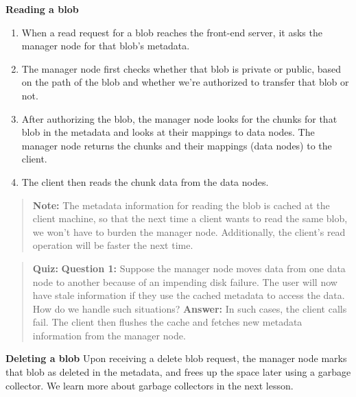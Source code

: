 \textbf{Reading a blob}

\begin{enumerate}
\item
\protect{}\label{Gf-6ti_XA_hLb9kWyqtnM}
When a read request for a blob reaches the front-end server, it asks the manager node for that blob's metadata.
\item
\protect{}\label{PPQFrrLTDBQUSFhFOc9dV}
The manager node first checks whether that blob is private or public, based on the path of the blob and whether we're authorized to transfer that blob or not.
\item
\protect{}\label{wihk1vpP8PLLsMmRy7M3V}
After authorizing the blob, the manager node looks for the chunks for that blob in the metadata and looks at their mappings to data nodes. The manager node returns the chunks and their mappings (data nodes) to the client.
\item
\protect{}\label{ZV54X82RJFnSiwgI63Z7U}
The client then reads the chunk data from the data nodes.
\end{enumerate}
\begin{quote}
\textbf{Note:} The metadata information for reading the blob is cached at the client machine, so that the next time a client wants to read the same blob, we won't have to burden the manager node. Additionally, the client's read operation will be faster the next time.
\end{quote}

\begin{quote}
\textbf{Quiz:}
\textbf{Question 1:} Suppose the manager node moves data from one data node to another because of an impending disk failure. The user will now have stale information if they use the cached metadata to access the data. How do we handle such situations?
\textbf{Answer:} In such cases, the client calls fail. The client then flushes the cache and fetches new metadata information from the manager node.
\end{quote}

\textbf{Deleting a blob} Upon receiving a delete blob request, the manager node marks that blob as deleted in the metadata, and frees up the space later using a garbage collector. We learn more about garbage collectors in the next lesson.

